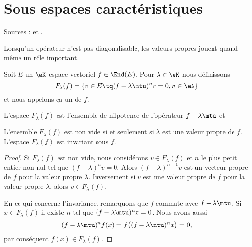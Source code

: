 \section{Sous espaces caractéristiques}


Sources : \cite{MneimneReduct} et .

Lorsqu'un opérateur n'est pas diagonalisable, les valeurs propres jouent quand même un rôle important.

\begin{definition}  \label{DefFBNIooCGbIix}
    Soit \( E\) un \( \eK\)-espace vectoriel  \( f\in\End(E)\). Pour \( \lambda\in \eK\) nous définissons
    \begin{equation}
        F_{\lambda}(f)=\{ v\in E\tq (f-\lambda\mtu)^nv=0, n\in\eN \}
    \end{equation}
    et nous appelons ça un  de \( f\).
\end{definition}
L'espace \( F_{\lambda}(f)\) est l'ensemble de nilpotence de l'opérateur \( f-\lambda\mtu\) et

\begin{lemma}   \label{LemBLPooHMAoyJ}
    L'ensemble \( F_{\lambda}(f)\) est non vide si et seulement si \( \lambda\) est une valeur propre de \( f\). L'espace \( F_{\lambda}(f)\) est invariant sous \( f\).
\end{lemma}

\begin{proof}
    Si \( F_{\lambda}(f)\) est non vide, nous considérons \( v\in F_{\lambda}(f)\) et \( n\) le plus petit entier non nul tel que \( (f-\lambda)^nv=0\). Alors \( (f-\lambda)^{n-1}v\) est un vecteur propre de \( f\) pour la valeur propre \( \lambda\). Inversement si \( v\) est une valeur propre de \( f\) pour la valeur propre \( \lambda\), alors \( v\in F_{\lambda}(f)\).

    En ce qui concerne l'invariance, remarquons que \( f\) commute avec \( f-\lambda\mtu\). Si \( x\in F_{\lambda}(f)\) il existe \( n\) tel que \( (f-\lambda\mtu)^nx=0\). Nous avons aussi
    \begin{equation}
        (f-\lambda\mtu)^nf(x)=f\big( (f-\lambda\mtu)^nx \big)=0,
    \end{equation}
    par conséquent \( f(x)\in F_{\lambda}(f)\).
\end{proof}

